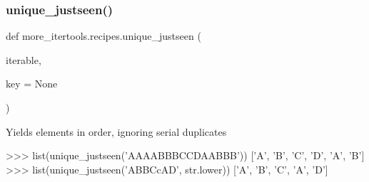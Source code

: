 \subsubsection{\texorpdfstring{unique\+\_\+justseen()}{unique\_justseen()}}
{\footnotesize\ttfamily def more\+\_\+itertools.\+recipes.\+unique\+\_\+justseen (\begin{DoxyParamCaption}\item[{}]{iterable,  }\item[{}]{key = {\ttfamily None} }\end{DoxyParamCaption})}

\begin{DoxyVerb}Yields elements in order, ignoring serial duplicates

    >>> list(unique_justseen('AAAABBBCCDAABBB'))
    ['A', 'B', 'C', 'D', 'A', 'B']
    >>> list(unique_justseen('ABBCcAD', str.lower))
    ['A', 'B', 'C', 'A', 'D']\end{DoxyVerb}
 